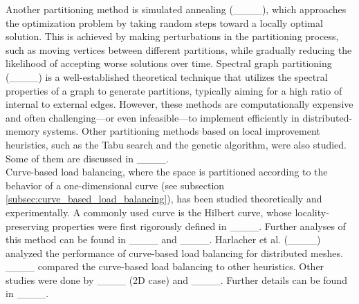 Another partitioning method is simulated annealing (____), which approaches the optimization problem by taking random steps toward a locally optimal solution. This is achieved by making perturbations in the partitioning process, such as moving vertices between different partitions, while gradually reducing the likelihood of accepting worse solutions over time.
Spectral graph partitioning (____) is a well-established theoretical technique that utilizes the spectral properties of a graph to generate partitions, typically aiming for a high ratio of internal to external edges. However, these methods are computationally expensive and often challenging—or even infeasible—to implement efficiently in distributed-memory systems.
Other partitioning methods based on local improvement heuristics, such as the Tabu search and the genetic algorithm, were also studied. Some of them are discussed in ____. \\
Curve-based load balancing, where the space is partitioned according to the behavior of a one-dimensional curve (see subsection \ref{subsec:curve_based_load_balancing}), has been studied theoretically and experimentally. A commonly used curve is the Hilbert curve, whose locality-preserving properties were first rigorously defined in ____. Further analyses of this method can be found in ____ and ____.
Harlacher et al. (____) analyzed the performance of curve-based load balancing for distributed meshes. \\
____ compared the curve-based load balancing to other heuristics. Other studies were done by ____ (2D case) and ____. 
Further details can be found in ____.